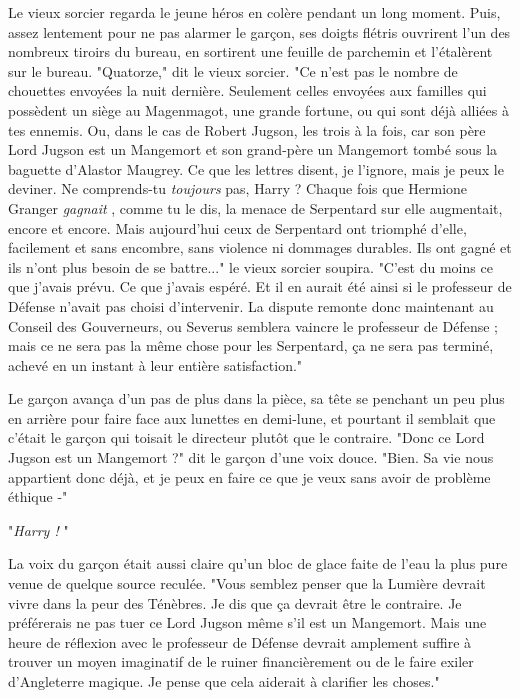 Le vieux sorcier regarda le jeune héros en colère pendant un long moment. Puis, assez lentement pour ne pas alarmer le garçon, ses doigts flétris ouvrirent l'un des nombreux tiroirs du bureau, en sortirent une feuille de parchemin et l'étalèrent sur le bureau. "Quatorze," dit le vieux sorcier. "Ce n'est pas le nombre de chouettes envoyées la nuit dernière. Seulement celles envoyées aux familles qui possèdent un siège au Magenmagot, une grande fortune, ou qui sont déjà alliées à tes ennemis. Ou, dans le cas de Robert Jugson, les trois à la fois, car son père Lord Jugson est un Mangemort et son grand-père un Mangemort tombé sous la baguette d'Alastor Maugrey. Ce que les lettres disent, je l'ignore, mais je peux le deviner. Ne comprends-tu \emph{toujours}  pas, Harry ? Chaque fois que Hermione Granger \emph{gagnait} , comme tu le dis, la menace de Serpentard sur elle augmentait, encore et encore. Mais aujourd'hui ceux de Serpentard ont triomphé d'elle, facilement et sans encombre, sans violence ni dommages durables. Ils ont gagné et ils n'ont plus besoin de se battre..." le vieux sorcier soupira. "C'est du moins ce que j'avais prévu. Ce que j'avais espéré. Et il en aurait été ainsi si le professeur de Défense n'avait pas choisi d'intervenir. La dispute remonte donc maintenant au Conseil des Gouverneurs, ou Severus semblera vaincre le professeur de Défense ; mais ce ne sera pas la même chose pour les Serpentard, ça ne sera pas terminé, achevé en un instant à leur entière satisfaction."

Le garçon avança d'un pas de plus dans la pièce, sa tête se penchant un peu plus en arrière pour faire face aux lunettes en demi-lune, et pourtant il semblait que c'était le garçon qui toisait le directeur plutôt que le contraire. "Donc ce Lord Jugson est un Mangemort ?" dit le garçon d'une voix douce. "Bien. Sa vie nous appartient donc déjà, et je peux en faire ce que je veux sans avoir de problème éthique -"

"\emph{Harry !} "

La voix du garçon était aussi claire qu'un bloc de glace faite de l'eau la plus pure venue de quelque source reculée. "Vous semblez penser que la Lumière devrait vivre dans la peur des Ténèbres. Je dis que ça devrait être le contraire. Je préférerais ne pas tuer ce Lord Jugson même s'il est un Mangemort. Mais une heure de réflexion avec le professeur de Défense devrait amplement suffire à trouver un moyen imaginatif de le ruiner financièrement ou de le faire exiler d'Angleterre magique. Je pense que cela aiderait à clarifier les choses."

